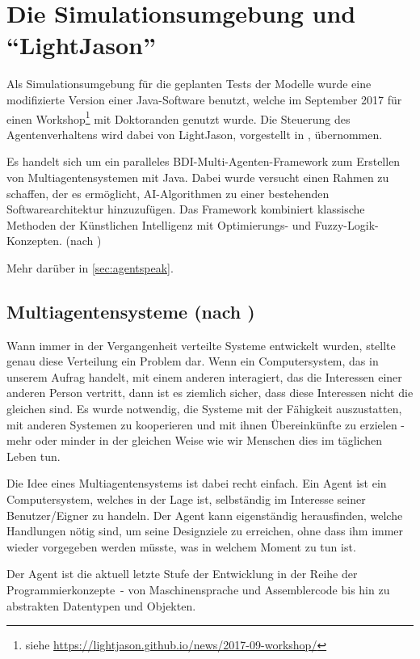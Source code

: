 \section{Die Simulationsumgebung und \enquote{LightJason}}
\label{sec:simulationsumgebung}

Als Simulationsumgebung für die geplanten Tests der Modelle wurde eine modifizierte Version einer Java-Software benutzt, welche im September 2017 für einen Workshop\footnote{siehe \url{https://lightjason.github.io/news/2017-09-workshop/}} mit Doktoranden genutzt wurde.
Die Steuerung des Agentenverhaltens wird dabei von LightJason, vorgestellt in \cite{lightjason}, übernommen.

Es handelt sich um ein paralleles BDI-Multi-Agenten-Framework zum Erstellen von Multiagentensystemen mit Java. 
Dabei wurde versucht einen Rahmen zu schaffen, der es ermöglicht, AI-Algorithmen zu einer bestehenden Softwarearchitektur hinzuzufügen. 
Das Framework kombiniert klassische Methoden der Künstlichen Intelligenz mit Optimierungs- und Fuzzy-Logik-Konzepten.
(nach \cite{lightjason-web})

Mehr darüber in \cref{sec:agentspeak}.

\subsection[Multiagentensysteme]{Multiagentensysteme (nach \cite{multiagent})}
\label{sec:multiagentensysteme}

Wann immer in der Vergangenheit verteilte Systeme entwickelt wurden, stellte genau diese Verteilung ein Problem dar. 
Wenn ein Computersystem, das in unserem Aufrag handelt, mit einem anderen interagiert, das die Interessen einer anderen Person vertritt, dann ist es ziemlich sicher, dass diese Interessen nicht die gleichen sind.
Es wurde notwendig, die Systeme mit der Fähigkeit auszustatten, mit anderen Systemen zu kooperieren und mit ihnen Übereinkünfte zu erzielen - mehr oder minder in der gleichen Weise wie wir Menschen dies im täglichen Leben tun.

Die Idee eines Multiagentensystems ist dabei recht einfach.
Ein Agent ist ein Computersystem, welches in der Lage ist, selbständig im Interesse seiner Benutzer/Eigner zu handeln.
Der Agent kann eigenständig herausfinden, welche Handlungen nötig sind, um seine Designziele zu erreichen, ohne dass ihm immer wieder vorgegeben werden müsste, was in welchem Moment zu tun ist.

Der Agent ist die aktuell letzte Stufe der Entwicklung in der Reihe der \mbox{Programmierkonzepte -} von Maschinensprache und Assemblercode bis hin zu abstrakten Datentypen und Objekten.

